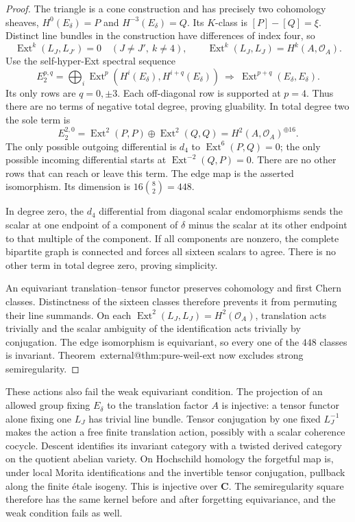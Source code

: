 \documentclass[11pt]{article}
\makeatletter
\providecommand{\compref}[1]{\csname external@#1\endcsname}
\theoremstyle{definition}
\theoremstyle{remark}
\newcommand{\C}{\mathbf C}
\makeatother
\begin{document}
\begin{proof}
The triangle is a cone construction and has precisely two cohomology sheaves, $H^0(E_\delta)=P$ and $H^{-3}(E_\delta)=Q$. Its $K$-class is $[P]-[Q]=\xi$. Distinct line bundles in the construction have differences of index four, so
\[
 \operatorname{Ext}^k(L_J,L_{J'})=0\quad(J\ne J',\ k\ne4),
 \qquad\operatorname{Ext}^k(L_J,L_J)=H^k(A,\mathcal O_A).
\]
Use the self-hyper-Ext spectral sequence
\[
 E_2^{p,q}=\bigoplus_i
 \operatorname{Ext}^p(H^i(E_\delta),H^{i+q}(E_\delta))
 \ \Longrightarrow\ \operatorname{Ext}^{p+q}(E_\delta,E_\delta).
\]
Its only rows are $q=0,\pm3$. Each off-diagonal row is supported at $p=4$. Thus there are no terms of negative total degree, proving gluability. In total degree two the sole term is
\[
 E_2^{2,0}=\operatorname{Ext}^2(P,P)\oplus\operatorname{Ext}^2(Q,Q)
       =H^2(A,\mathcal O_A)^{\oplus16}.
\]
The only possible outgoing differential is $d_4$ to $\operatorname{Ext}^6(P,Q)=0$; the only possible incoming differential starts at $\operatorname{Ext}^{-2}(Q,P)=0$. There are no other rows that can reach or leave this term. The edge map is the asserted isomorphism. Its dimension is $16\binom82=448$.

In degree zero, the $d_4$ differential from diagonal scalar endomorphisms sends the scalar at one endpoint of a component of $\delta$ minus the scalar at its other endpoint to that multiple of the component. If all components are nonzero, the complete bipartite graph is connected and forces all sixteen scalars to agree. There is no other term in total degree zero, proving simplicity.

An equivariant translation--tensor functor preserves cohomology and first Chern classes. Distinctness of the sixteen classes therefore prevents it from permuting their line summands. On each $\operatorname{Ext}^2(L_J,L_J)=H^2(\mathcal O_A)$, translation acts trivially and the scalar ambiguity of the identification acts trivially by conjugation. The edge isomorphism is equivariant, so every one of the $448$ classes is invariant. Theorem~\compref{thm:pure-weil-ext} now excludes strong semiregularity.
\end{proof}

These actions also fail the weak equivariant condition. The projection of an allowed group fixing $E_\delta$ to the translation factor $A$ is injective: a tensor functor alone fixing one $L_J$ has trivial line bundle. Tensor conjugation by one fixed $L_J^{-1}$ makes the action a free finite translation action, possibly with a scalar coherence cocycle. Descent identifies its invariant category with a twisted derived category on the quotient abelian variety. On Hochschild homology the forgetful map is, under local Morita identifications and the invertible tensor conjugation, pullback along the finite \'etale isogeny. This is injective over $\C$. The semiregularity square therefore has the same kernel before and after forgetting equivariance, and the weak condition fails as well.
\end{document}
